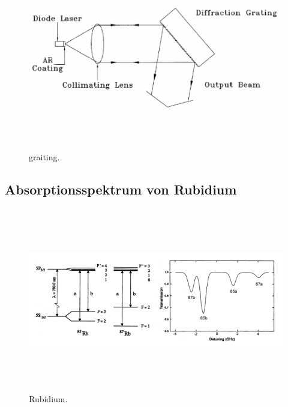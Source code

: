 \begin{figure}[H]
    \centering
    \includegraphics[height=8cm]{content/pics/graiting.png}
    \caption{graiting. \cite{V60}}
    \label{fig:graiting}
\end{figure}

\subsection{Absorptionsspektrum von Rubidium}

\begin{figure}[H]
    \centering
    \includegraphics[height=8cm]{content/pics/Rubidium.png}
    \caption{Rubidium. \cite{V60}}
    \label{fig:rubidium}
\end{figure}

